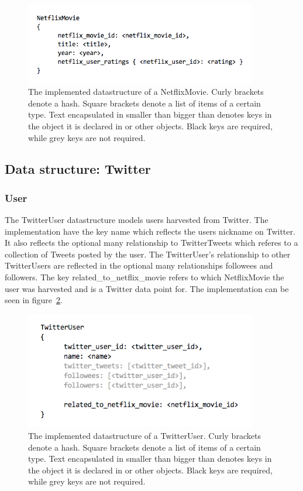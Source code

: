 	\begin{figure}[H]
	\includegraphics[width=4in]{image/datastructure-netflix-movie.png}
	\centering
	\caption{The implemented datastructure of a NetflixMovie. Curly brackets denote a hash. Square brackets denote a list of items of a certain type. Text encapsulated in smaller than bigger than denotes keys in the object it is declared in or other objects. Black keys are required, while grey keys are not required.}
	\label{figure:datastructure-netflix-movie}
	\end{figure}

\subsection{Data structure: Twitter}

\subsubsection{User}
The TwitterUser datastructure models users harvested from Twitter. The implementation have the key name which reflects the users nickname on Twitter. It also reflects the optional many relationship to TwitterTweets which referes to a collection of Tweets posted by the user. The TwitterUser's relationship to other TwitterUsers are reflected in the optional many relationships followees and followers. The key related\_to\_netflix\_movie refers to which NetflixMovie the user was harvested and is a Twitter data point for. The implementation can be seen in figure~\ref{figure:datastructure-twitter-user}.

	\begin{figure}[H]
	\includegraphics[width=4in]{image/datastructure-twitter-user.png}
	\centering
	\caption{The implemented datastructure of a TwitterUser. Curly brackets denote a hash. Square brackets denote a list of items of a certain type. Text encapsulated in smaller than bigger than denotes keys in the object it is declared in or other objects. Black keys are required, while grey keys are not required.}
	\label{figure:datastructure-twitter-user}
	\end{figure}


